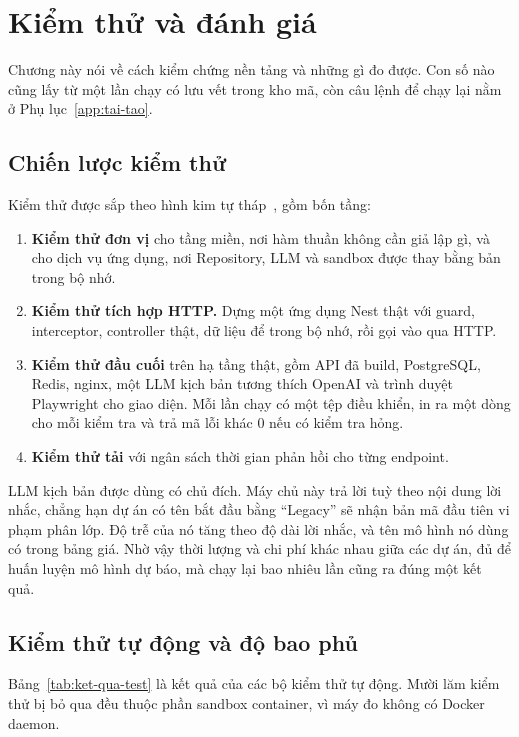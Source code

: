 \chapter{Kiểm thử và đánh giá}
\label{chap:kiem-thu}

Chương này nói về cách kiểm chứng nền tảng và những gì đo được. Con số nào cũng lấy từ một lần chạy có lưu vết trong kho mã, còn câu lệnh để chạy lại nằm ở Phụ lục~\ref{app:tai-tao}.

\section{Chiến lược kiểm thử}

Kiểm thử được sắp theo hình kim tự tháp~\cite{cohn2009}, gồm bốn tầng:

\begin{enumerate}
\item \textbf{Kiểm thử đơn vị} cho tầng miền, nơi hàm thuần không cần giả lập gì, và cho dịch vụ ứng dụng, nơi Repository, LLM và sandbox được thay bằng bản trong bộ nhớ.
\item \textbf{Kiểm thử tích hợp HTTP.} Dựng một ứng dụng Nest thật với guard, interceptor, controller thật, dữ liệu để trong bộ nhớ, rồi gọi vào qua HTTP.
\item \textbf{Kiểm thử đầu cuối} trên hạ tầng thật, gồm API đã build, PostgreSQL, Redis, nginx, một LLM kịch bản tương thích OpenAI và trình duyệt Playwright cho giao diện. Mỗi lần chạy có một tệp điều khiển, in ra một dòng cho mỗi kiểm tra và trả mã lỗi khác 0 nếu có kiểm tra hỏng.
\item \textbf{Kiểm thử tải} với ngân sách thời gian phản hồi cho từng endpoint.
\end{enumerate}

LLM kịch bản được dùng có chủ đích. Máy chủ này trả lời tuỳ theo nội dung lời nhắc, chẳng hạn dự án có tên bắt đầu bằng ``Legacy'' sẽ nhận bản mã đầu tiên vi phạm phân lớp. Độ trễ của nó tăng theo độ dài lời nhắc, và tên mô hình nó dùng có trong bảng giá. Nhờ vậy thời lượng và chi phí khác nhau giữa các dự án, đủ để huấn luyện mô hình dự báo, mà chạy lại bao nhiêu lần cũng ra đúng một kết quả.

\section{Kiểm thử tự động và độ bao phủ}

Bảng~\ref{tab:ket-qua-test} là kết quả của các bộ kiểm thử tự động. Mười lăm kiểm thử bị bỏ qua đều thuộc phần sandbox container, vì máy đo không có Docker daemon.

